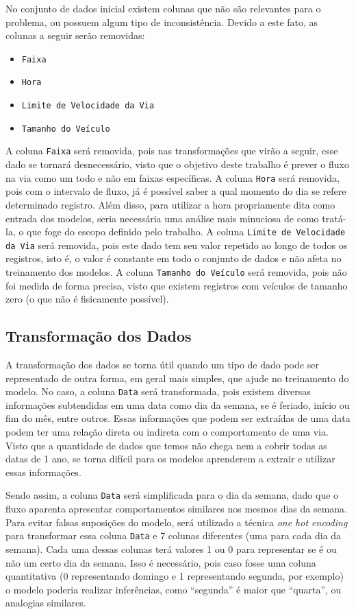 No conjunto de dados inicial existem colunas que não são relevantes para o problema, ou possuem algum tipo de inconsistência. Devido a este fato, as colunas a seguir serão removidas:

\begin{itemize}
    \item \texttt{Faixa}
    \item  \texttt{Hora}
    \item \texttt{Limite de Velocidade da Via}
    \item  \texttt{Tamanho do Veículo}
\end{itemize}

A coluna \texttt{Faixa} será removida, pois nas transformações que virão a seguir, esse dado se tornará desnecessário, visto que o objetivo deste trabalho é prever o fluxo na via como um todo e não em faixas específicas. A coluna \texttt{Hora} será removida, pois com o intervalo de fluxo, já é possível saber a qual momento do dia se refere determinado registro. Além disso, para utilizar a hora propriamente dita como entrada dos modelos, seria necessária uma análise mais minuciosa de como tratá-la, o que foge do escopo definido pelo trabalho. A coluna \texttt{Limite de Velocidade da Via} será removida, pois este dado tem seu valor repetido ao longo de todos os registros, isto é, o valor é constante em todo o conjunto de dados e não afeta no treinamento dos modelos. A coluna \texttt{Tamanho do Veículo} será removida, pois não foi medida de forma precisa, visto que existem registros com veículos de tamanho zero (o que não é fisicamente possível).

\subsection{Transformação dos Dados}

A transformação dos dados se torna útil quando um tipo de dado pode ser representado de outra forma, em geral mais simples, que ajude no treinamento do modelo. No caso, a coluna \texttt{Data} será transformada, pois existem diversas informações subtendidas em uma data como dia da semana, se é feriado, início ou fim do mês, entre outros. Essas informações que podem ser extraídas de uma data podem ter uma relação direta ou indireta com o comportamento de uma via. Visto que a quantidade de dados que temos não chega nem a cobrir todas as datas de 1 ano, se torna difícil para os modelos aprenderem a extrair e utilizar essas informações. 

Sendo assim, a coluna \texttt{Data} será simplificada para o dia da semana, dado que o fluxo aparenta apresentar comportamentos similares nos mesmos dias da semana. Para evitar falsas suposições do modelo, será utilizado a técnica \textit{one hot encoding} para transformar essa coluna \texttt{Data} e 7 colunas diferentes (uma para cada dia da semana). Cada uma dessas colunas terá valores 1 ou 0 para representar se é ou não um certo dia da semana. Isso é necessário, pois caso fosse uma coluna quantitativa (0 representando domingo e 1 representando segunda, por exemplo) o modelo poderia realizar inferências, como ``segunda'' é maior que ``quarta'', ou analogias similares.

